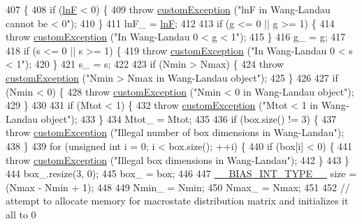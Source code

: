 \begin{DoxyCode}
407                                                                                                            
                                     \{
408     \textcolor{keywordflow}{if} (\hyperlink{classwala_acb8e59580d97bc3c5b9b4ff45eb6bb9a}{lnF} < 0) \{
409         \textcolor{keywordflow}{throw} \hyperlink{classcustom_exception}{customException} (\textcolor{stringliteral}{"lnF in Wang-Landau cannot be < 0"});
410     \}
411     lnF\_ = \hyperlink{classwala_acb8e59580d97bc3c5b9b4ff45eb6bb9a}{lnF};
412 
413     \textcolor{keywordflow}{if} (g <= 0 || g >= 1) \{
414         \textcolor{keywordflow}{throw} \hyperlink{classcustom_exception}{customException} (\textcolor{stringliteral}{"In Wang-Landau 0 < g < 1"});
415     \}
416     g\_ = g;
417 
418     \textcolor{keywordflow}{if} (s <= 0 || s >= 1) \{
419         \textcolor{keywordflow}{throw} \hyperlink{classcustom_exception}{customException} (\textcolor{stringliteral}{"In Wang-Landau 0 < s < 1"});
420     \}
421     s\_ = s;
422 
423     \textcolor{keywordflow}{if} (Nmin > Nmax) \{
424         \textcolor{keywordflow}{throw} \hyperlink{classcustom_exception}{customException} (\textcolor{stringliteral}{"Nmin > Nmax in Wang-Landau object"});
425     \}
426 
427     \textcolor{keywordflow}{if} (Nmin < 0) \{
428         \textcolor{keywordflow}{throw} \hyperlink{classcustom_exception}{customException} (\textcolor{stringliteral}{"Nmin < 0 in Wang-Landau object"});
429     \}
430 
431     \textcolor{keywordflow}{if} (Mtot < 1) \{
432         \textcolor{keywordflow}{throw} \hyperlink{classcustom_exception}{customException} (\textcolor{stringliteral}{"Mtot < 1 in Wang-Landau object"});
433     \}
434     Mtot\_ = Mtot;
435 
436     \textcolor{keywordflow}{if} (box.size() != 3) \{
437         \textcolor{keywordflow}{throw} \hyperlink{classcustom_exception}{customException} (\textcolor{stringliteral}{"Illegal number of box dimensions in Wang-Landau"});
438     \}
439     \textcolor{keywordflow}{for} (\textcolor{keywordtype}{unsigned} \textcolor{keywordtype}{int} i = 0; i < box.size(); ++i) \{
440         \textcolor{keywordflow}{if} (box[i] < 0) \{
441             \textcolor{keywordflow}{throw} \hyperlink{classcustom_exception}{customException} (\textcolor{stringliteral}{"Illegal box dimensions in Wang-Landau"});
442         \}
443     \}
444     box\_.resize(3, 0);
445     box\_ = box;
446 
447     \hyperlink{bias_8h_a1ceb524363fcb94da0c64d297ea27438}{\_\_BIAS\_INT\_TYPE\_\_} size = (Nmax - Nmin + 1);
448 
449     Nmin\_ = Nmin;
450     Nmax\_ = Nmax;
451 
452     \textcolor{comment}{// attempt to allocate memory for macrostate distribution matrix and initializes it all to 0}

\end{DoxyCode}
